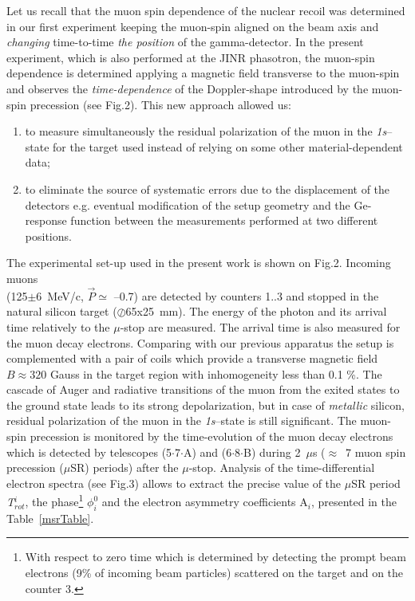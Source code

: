         Let us recall that the muon spin dependence of the nuclear
recoil was
determined in our first experiment keeping the muon-spin aligned on the
beam 
axis and {\em changing} time-to-time {\em the position} of the
gamma-detector. 
In the present experiment, which is also performed at  the JINR
phasotron, 
the muon-spin dependence is determined applying  a magnetic field
transverse
to the muon-spin  and observes the {\em time-dependence} of the 
Doppler-shape introduced by the muon-spin precession (see Fig.2). This
new 
approach allowed us:
\begin{enumerate}
\item to measure simultaneously the residual polarization of the muon in 
the {\it1s}--state
for the target used instead of relying on
some other material-dependent data;
\item to eliminate the source of systematic errors due to
the displacement of the
detectors e.g. eventual modification of the setup geometry and the
Ge-response function between
the measurements performed at two different positions.
\end{enumerate} 
The experimental set-up used in the present work is shown on Fig.2.
Incoming
muons \\ (125$\pm$6~MeV/c, $\vec{P}\simeq$ --0.7) are detected by
counters 1..3
and stopped in the natural silicon target ($\oslash$65x25~mm).
The energy of the photon and its arrival time relatively
to the $\mu$-stop are measured. The arrival time is also measured for
the
muon decay electrons. Comparing with our previous
apparatus\cite{Brudanin95}
the setup is complemented with a pair of
coils which provide a transverse  magnetic field $B \approx 320 $ Gauss
in the target 
region with inhomogeneity less than 0.1 \%.  
The cascade of Auger and radiative transitions of the muon from the
exited states
to the 
ground state leads to its strong depolarization, but in case
of {\em metallic} silicon, residual polarization of the muon in the
{\it1s}--state is
still significant.  The muon-spin precession is monitored by the
time-evolution
of the muon decay electrons which is detected by telescopes
(5$\cdot$7$\cdot$A) 
and (6$\cdot$8$\cdot$B) during 2~$\mu$s ($\approx$~7 muon spin
precession 
($\mu$SR) periods) 
after the $\mu$-stop. Analysis of the time-differential electron spectra
(see Fig.3) 
allows to extract the precise value  of the $\mu$SR period 
{\it T$_{rot}^i$}, the phase\footnote{With respect to zero time
which is determined by detecting the prompt beam electrons (9\% of
incoming beam
particles) scattered on the
target and on the counter 3.} $\phi_i^0$ and the electron 
asymmetry coefficients A$_i$, presented in the Table~\ref{msrTable}. 

